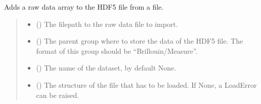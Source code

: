 \documentclass[letterpaper,10pt,english]{sphinxmanual}
\begin{document}
\begin{fulllineitems}
\begin{fulllineitems}
\end{fulllineitems}


\begin{fulllineitems}
\label{\detokenize{_autosummary/HDF5_BLS.wrapper:HDF5_BLS.wrapper.Wrapper.import_raw_data}}
\pysigstartsignatures
\pysiglinewithargsret
{}
{\sphinxparamcomma {}\sphinxparamcomma {}\sphinxparamcomma {}\sphinxparamcomma {}\sphinxparamcomma {}\sphinxparamcomma {}}
{}
\pysigstopsignatures
\sphinxAtStartPar
Adds a raw data array to the HDF5 file from a file.
\begin{quote}\begin{description}
\begin{itemize}
\item {} 
\sphinxAtStartPar
{} () \textendash{} The filepath to the raw data file to import.

\item {} 
\sphinxAtStartPar
{} (\sphinxstyleliteralemphasis{\sphinxupquote{, }}) \textendash{} The parent group where to store the data of the HDF5 file. The format of this group should be “Brillouin/Measure”.

\item {} 
\sphinxAtStartPar
{} (\sphinxstyleliteralemphasis{\sphinxupquote{, }}) \textendash{} The name of the dataset, by default None.

\item {} 
\sphinxAtStartPar
{} (\sphinxstyleliteralemphasis{\sphinxupquote{, }}) \textendash{} The structure of the file that has to be loaded. If None, a LoadError can be raised.


\end{itemize}
\end{description}
\end{quote}
\end{fulllineitems}
\end{fulllineitems}
\end{document}
